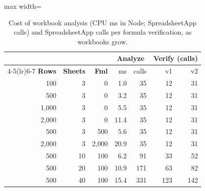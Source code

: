 \begin{table}
\caption{Cost of workbook analysis (CPU ms in Node; SpreadsheetApp calls) and SpreadsheetApp calls per formula verification, as workbooks grow.}
\label{tab:e3}

\centering\footnotesize
\begin{adjustbox}{max width=\columnwidth}\begin{tabular}{rrr rr rr}
\toprule
& & & \multicolumn{2}{c}{\textbf{Analyze}} & \multicolumn{2}{c}{\textbf{Verify} (calls)} \\
\cmidrule(lr){4-5}\cmidrule(lr){6-7}
\textbf{Rows} & \textbf{Sheets} & \textbf{Fml} & ms & calls & v1 & v2 \\
\midrule
100 & 3 & 0 & 1.0 & 35 & 12 & 31 \\
500 & 3 & 0 & 3.2 & 35 & 12 & 31 \\
1{,}000 & 3 & 0 & 5.5 & 35 & 12 & 31 \\
2{,}000 & 3 & 0 & 11.4 & 35 & 12 & 31 \\
500 & 3 & 500 & 5.6 & 35 & 12 & 31 \\
2{,}000 & 3 & 2{,}000 & 20.9 & 35 & 12 & 31 \\
500 & 10 & 100 & 6.2 & 91 & 33 & 52 \\
500 & 20 & 100 & 10.9 & 171 & 63 & 82 \\
500 & 40 & 100 & 15.4 & 331 & 123 & 142 \\
\bottomrule
\end{tabular}\end{adjustbox}
\end{table}
